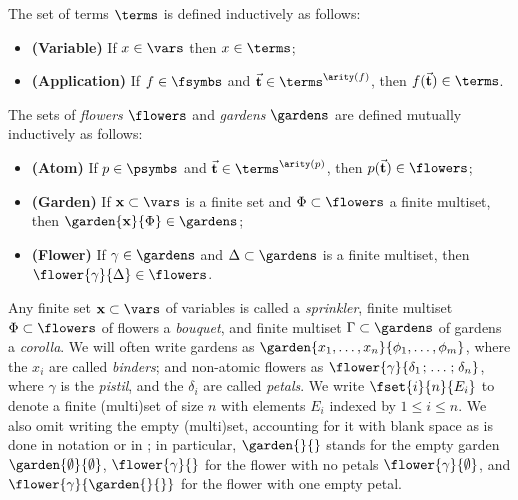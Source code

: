 \begin{definition}[Terms]
  The set of terms $\terms$ is defined inductively as follows:
  \begin{itemize}
    \item{\textbf{(Variable)}} If $x \in \vars$ then $x \in \terms$;
    \item{\textbf{(Application)}} If $f \in \fsymbs$ and $\tvec{t}
    \in \terms^{\arity(f)}$, then $f(\tvec{t}) \in \terms$.
  \end{itemize}
\end{definition}

\begin{definition}[Flowers]
  The sets of \emph{flowers} $\flowers$ and \emph{gardens} $\gardens$ are
  defined mutually inductively as follows:
  \begin{itemize}
    \item{\textbf{(Atom)}} If $p \in \psymbs$ and $\tvec{t} \in
    \terms^{\arity(p)}$, then $p(\tvec{t}) \in \flowers$;
    \item{\textbf{(Garden)}} If $\bx \subset \vars$ is a finite set and $\Phi
    \subset \flowers$ a finite multiset, then $\garden{\bx}{\Phi} \in
    \gardens$;
    \item{\textbf{(Flower)}} If $\gamma \in \gardens$ and $\Delta \subset \gardens$
    is a finite multiset, then $\flower{\gamma}{\Delta} \in \flowers$.
  \end{itemize}
\end{definition}

Any finite set $\bx \subset \vars$ of variables is called a \emph{sprinkler},
finite multiset $\Phi \subset \flowers$ of flowers a \emph{bouquet}, and finite
multiset $\Gamma \subset \gardens$ of gardens a \emph{corolla}. We will often
write gardens as $\garden{x_1, \ldots, x_n}{\phi_1, \ldots, \phi_m}$, where the
$x_i$ are called \emph{binders}; and non-atomic flowers as
$\flower{\gamma}{\delta_1 \sep \ldots \sep \delta_n}$, where $\gamma$ is the
\emph{pistil}, and the $\delta_i$ are called \emph{petals}. We write
$\fset{i}{n}{E_i}$ to denote a finite (multi)set of size $n$ with elements $E_i$
indexed by $1 \leq i \leq n$. We also omit writing the empty (multi)set,
accounting for it with blank space as is done in  notation or in ; in
particular, $\garden{{}}{{}}$ stands for the empty garden
$\garden{\emptyset}{\emptyset}$, $\flower{\gamma}{{}}$ for the flower with no
petals $\flower{\gamma}{\emptyset}$, and $\flower{\gamma}{\garden{{}}{{}}}$ for
the flower with one empty petal.

